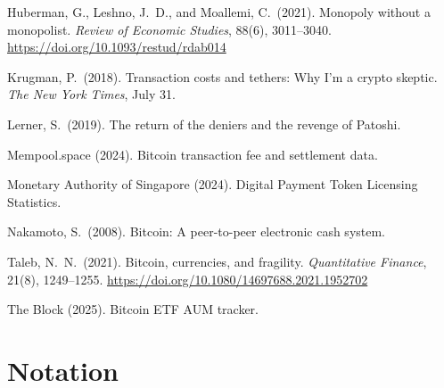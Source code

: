 \documentclass[12pt]{article}
\theoremstyle{definition}
\theoremstyle{remark}
\begin{document}
\begin{description}[style=nextline,leftmargin=0pt,labelsep=0pt,font=\normalfont]
\item Huberman, G., Leshno, J.\ D., and Moallemi, C.\ (2021). Monopoly without a
monopolist. \emph{Review of Economic Studies}, 88(6), 3011--3040.
\url{https://doi.org/10.1093/restud/rdab014}

\item Krugman, P.\ (2018). Transaction costs and tethers: Why I'm a crypto
skeptic. \emph{The New York Times}, July 31.

\item Lerner, S.\ (2019). The return of the deniers and the revenge of Patoshi.

\item Mempool.space (2024). Bitcoin transaction fee and settlement data.

\item Monetary Authority of Singapore (2024). Digital Payment Token Licensing
Statistics.

\item Nakamoto, S.\ (2008). Bitcoin: A peer-to-peer electronic cash system.

\item Taleb, N.\ N.\ (2021). Bitcoin, currencies, and fragility.
\emph{Quantitative Finance}, 21(8), 1249--1255.
\url{https://doi.org/10.1080/14697688.2021.1952702}

\item The Block (2025). Bitcoin ETF AUM tracker.

\end{description}


\appendix

\section{Notation}
\end{document}
